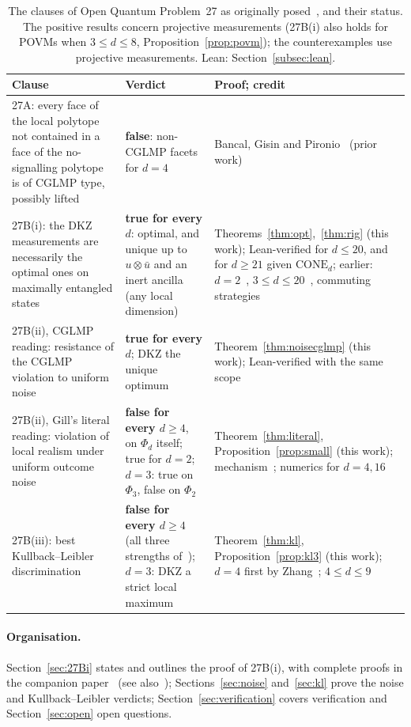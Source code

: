 \documentclass[11pt]{article}
\theoremstyle{remark}
\numberwithin{equation}{section}
\newcommand{\CONE}{\mathrm{CONE}}
\begin{document}
\begin{table}[t]
\centering\small
\caption{The clauses of Open Quantum Problem~27 as originally posed~\cite{OQP}, and their status. The positive results
concern projective measurements (27B(i) also holds for POVMs when $3\le d\le8$, Proposition~\ref{prop:povm}); the
counterexamples use projective measurements. Lean: Section~\ref{subsec:lean}.}
\label{tab:status}
\begin{tabular}{@{}>{\raggedright\arraybackslash}p{}>{\raggedright\arraybackslash}p{}>{\raggedright\arraybackslash}p{}@{}}
\toprule
Clause & Verdict & Proof; credit\\
\midrule
27A: every face of the local polytope not contained in a face of the no-signalling polytope is of CGLMP type,
possibly lifted & \textbf{false}: non-CGLMP facets for $d=4$ & Bancal, Gisin and Pironio~\cite{BGP} (prior work)\\
27B(i): the DKZ measurements are necessarily the optimal ones on maximally entangled states & \textbf{true for every
$d$}: optimal, and unique up to $u\otimes\bar u$ and an inert ancilla (any local dimension) &
Theorems~\ref{thm:opt},~\ref{thm:rig} (this work); Lean-verified for $d\le20$, and for $d\ge21$ given $\CONE_d$;
earlier: $d=2$~\cite{Tsirelson}, $3\le d\le20$~\cite{repoCGLMP}, commuting strategies~\cite{MSclassical}\\
27B(ii), CGLMP reading: resistance of the CGLMP violation to uniform noise & \textbf{true for every $d$}; DKZ the
unique optimum & Theorem~\ref{thm:noisecglmp} (this work); Lean-verified with the same scope\\
27B(ii), Gill's literal reading: violation of local realism under uniform outcome noise & \textbf{false for every
$d\ge4$}, on $\Phi_d$ itself; true for $d=2$; $d=3$: true on $\Phi_3$, false on $\Phi_2$ &
Theorem~\ref{thm:literal}, Proposition~\ref{prop:small} (this work); mechanism~\cite[eq.~(14)]{ADGL}; numerics for
$d=4,16$~\cite{BRL}\\
27B(iii): best Kullback--Leibler discrimination & \textbf{false for every $d\ge4$} (all three strengths
of~\cite{vDGG}); $d=3$: DKZ a strict local maximum & Theorem~\ref{thm:kl}, Proposition~\ref{prop:kl3} (this work);
$d=4$ first by Zhang~\cite{Zhang}; $4\le d\le9$~\cite{repoCGLMP}\\
\bottomrule
\end{tabular}
\end{table}

\paragraph{Organisation.}
Section~\ref{sec:27Bi} states and outlines the proof of 27B(i), with complete proofs in the companion
paper~\cite{MSmath} (see also~\cite{MSoverview}); Sections~\ref{sec:noise} and~\ref{sec:kl} prove the noise and
Kullback--Leibler verdicts; Section~\ref{sec:verification} covers verification and Section~\ref{sec:open} open questions.
\end{document}
